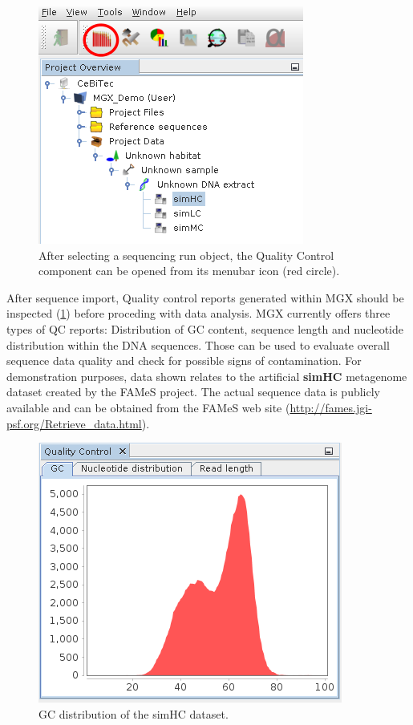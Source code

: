\begin{figure}[H]
\centering
\includegraphics[width=.6\textwidth]{img/mgx/QCopen}
\caption[Quality control]{After selecting a sequencing run object, the Quality Control component can be opened
from its menubar icon (red circle).}
\label{qcopen}
\end{figure}

After sequence import, Quality control reports generated within MGX should be inspected (\ref{qcopen}) before proceding with data analysis.
MGX currently offers three types of QC reports: Distribution of GC content, sequence length
and nucleotide distribution within the DNA sequences. Those can be used to evaluate overall
sequence data quality and check for possible signs of contamination.
For demonstration purposes, data shown relates to the artificial \textbf{simHC} metagenome dataset created by the
FAMeS \cite{SIMMETA} project. The actual sequence data is publicly available and can be obtained from
the FAMeS web site (\url{http://fames.jgi-psf.org/Retrieve_data.html}).

\begin{figure}[H]
\centering
\includegraphics[width=.6\textwidth]{img/mgx/QCgc}
\caption[Quality control]{GC distribution of the simHC dataset.}
\label{qc1}
\end{figure}

